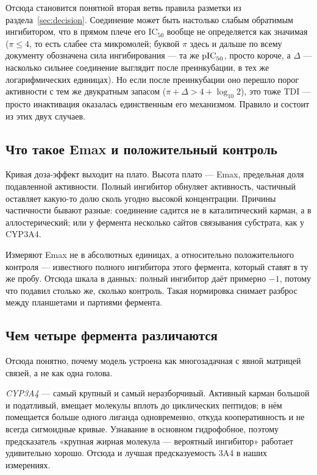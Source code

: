 Отсюда становится понятной вторая ветвь правила разметки из раздела~\ref{sec:decision}. Соединение может
быть настолько слабым обратимым ингибитором, что в прямом плече его IC$_{50}$ вообще не определяется
как значимая ($\pi \le 4$, то есть слабее ста микромолей; буквой $\pi$ здесь и дальше по всему
документу обозначена сила ингибирования --- та же $\mathrm{pIC}_{50}$, просто короче, а $\Delta$ --- насколько
сильнее соединение выглядит после преинкубации, в тех же логарифмических единицах). Но если после
преинкубации оно перешло порог активности с тем же двукратным запасом
($\pi + \Delta > 4 + \log_{10}2$), это тоже TDI --- просто
инактивация оказалась единственным его механизмом. Правило и состоит из этих двух случаев.

\subsection{Что такое Emax и положительный контроль}

Кривая доза-эффект выходит на плато. Высота плато --- Emax, предельная доля подавленной активности.
Полный ингибитор обнуляет активность, частичный оставляет какую-то долю сколь угодно высокой
концентрации. Причины частичности бывают разные: соединение садится не в каталитический карман,
а в аллостерический; или у фермента несколько сайтов связывания субстрата, как у CYP3A4.

Измеряют Emax не в абсолютных единицах, а относительно положительного контроля --- известного полного
ингибитора этого фермента, который ставят в ту же пробу. Отсюда шкала в данных: полный ингибитор даёт
примерно $-1$, потому что подавил столько же, сколько контроль. Такая нормировка снимает разброс между
планшетами и партиями фермента.

\subsection{Чем четыре фермента различаются}
\label{sec:isoforms}

Отсюда понятно, почему модель устроена как многозадачная с явной матрицей связей, а не как одна голова.

\emph{CYP3A4} --- самый крупный и самый неразборчивый. Активный карман большой и податливый, вмещает
молекулы вплоть до циклических пептидов; в нём помещается больше одного лиганда одновременно, откуда
кооперативность и не всегда сигмоидные кривые. Узнавание в основном гидрофобное, поэтому предсказатель
«крупная жирная молекула --- вероятный ингибитор» работает удивительно хорошо. Отсюда и лучшая
предсказуемость 3A4 в наших измерениях.

